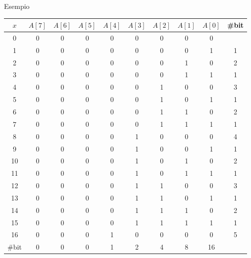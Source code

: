 \begin{frame}[shrink=5]{Esempio}

\vspace{-6pt}
\small
\begin{tabular}{ccccccccc|c}
 $x$  &  $A[7]$ & $A[6]$ & $A[5]$ & $A[4]$ & $A[3]$ & $A[2]$ & $A[1]$ & $A[0]$ & \#bit \\\hline
 0 & 0 & 0 & 0 & 0 & 0 & 0 & 0 & 0 \\
 1 & 0 & 0 & 0 & 0 & 0 & 0 & 0 & \alert{1} & 1 \\
 2 & 0 & 0 & 0 & 0 & 0 & 0 & \alert{1} & \alert{0} & 2 \\
 3 & 0 & 0 & 0 & 0 & 0 & 0 & 1 & \alert{1} & 1 \\
 4 & 0 & 0 & 0 & 0 & 0 & \alert{1} & \alert{0} & \alert{0} & 3 \\
 5 & 0 & 0 & 0 & 0 & 0 & 1 & 0 & \alert{1} & 1 \\
 6 & 0 & 0 & 0 & 0 & 0 & 1 & \alert{1} & \alert{0} & 2 \\
 7 & 0 & 0 & 0 & 0 & 0 & 1 & 1 & \alert{1} & 1 \\
 8 & 0 & 0 & 0 & 0 & \alert{1} & \alert{0} & \alert{0} & \alert{0} & 4 \\
 9 & 0 & 0 & 0 & 0 & 1 & 0 & 0 & \alert{1} & 1 \\
10 & 0 & 0 & 0 & 0 & 1 & 0 & \alert{1} & \alert{0} & 2 \\
11 & 0 & 0 & 0 & 0 & 1 & 0 & 1 & \alert{1} & 1 \\
12 & 0 & 0 & 0 & 0 & 1 & \alert{1} & \alert{0} & \alert{0} & 3 \\
13 & 0 & 0 & 0 & 0 & 1 & 1 & 0 & \alert{1} & 1 \\
14 & 0 & 0 & 0 & 0 & 1 & 1 & \alert{1} & \alert{0} & 2 \\
15 & 0 & 0 & 0 & 0 & 1 & 1 & 1 & \alert{1} & 1 \\
16 & 0 & 0 & 0 & \alert{1} & \alert{0} & \alert{0} & \alert{0} & \alert{0} & 5 \\\hline
\#bit & 0 & 0 & 0 & 1 & 2 & 4 & 8 & 16 &  \\
\end{tabular}    

\end{frame}


